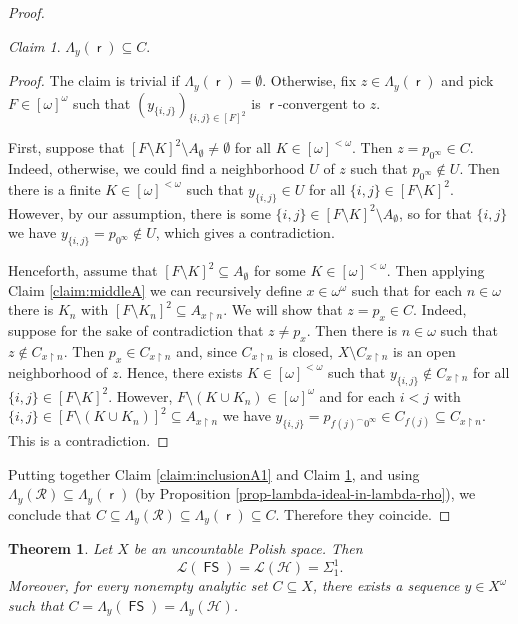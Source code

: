\documentclass{amsart}
\theoremstyle{plain}
\newtheorem{thm}{Theorem}[section]
\theoremstyle{definition}
\theoremstyle{remark}
\newtheorem{claim}{Claim}
\DeclareMathOperator{\FS}{\mathsf{FS}}
\DeclareMathOperator{\rr}{\mathsf{r}}
\begin{document}
\begin{proof}
\begin{claim}\label{claim:inclusionA2}
    $\Lambda_y(\rr)\subseteq C$.
\end{claim}
\begin{proof}
The claim is trivial if $\Lambda_y(\rr)=\emptyset$. Otherwise, fix $z \in \Lambda_y(\rr)$ and pick $F\in[\omega]^\omega$ such that $(y_{\{i,j\}})_{\{i,j\}\in[F]^2}$  
is $\rr$-convergent to $z$. 

First, suppose that $[F\setminus K]^2\setminus A_\emptyset\neq\emptyset$ for all $K\in[\omega]^{<\omega}$. Then $z=p_{0^\infty} \in C$. Indeed, otherwise, we could find a neighborhood $U$ of $z$ such that $p_{0^\infty}\notin U$. Then there is a finite $K\in[\omega]^{<\omega}$ such that $y_{\{i,j\}}\in U$ for all $\{i,j\}\in[F\setminus K]^2$. However, by our assumption, there is some $\{i,j\}\in[F\setminus K]^2\setminus A_\emptyset$, so for that $\{i,j\}$ we have $y_{\{i,j\}}=p_{0^\infty}\notin U$, which gives a contradiction.

Henceforth, assume that $[F\setminus K]^2\subseteq A_\emptyset$ for some $K\in[\omega]^{<\omega}$. Then applying Claim \ref{claim:middleA} we can recursively define $x\in\omega^\omega$ such that for each $n\in\omega$ there is $K_n$ with $[F\setminus K_n]^2\subseteq A_{x\restriction n}$. We will show that $z=p_x\in C$. 
Indeed, suppose for the sake of contradiction that $z\neq p_x$. Then there is $n\in\omega$ such that $z\notin C_{x\restriction n}$. Then $p_x\in C_{x\restriction n}$ and, since $C_{x\restriction n}$ is closed, $X\setminus C_{x\restriction n}$ is an open neighborhood of $z$. Hence, there exists $K\in[\omega]^{<\omega}$ such that $y_{\{i,j\}}\notin C_{x\restriction n}$ for all $\{i,j\}\in[F\setminus K]^2$. However, $F\setminus (K\cup K_n)\in[\omega]^\omega$ and for each $i<j$ with $\{i,j\}\in [F\setminus (K\cup K_n)]^2\subseteq A_{x\restriction n}$ we have $y_{\{i,j\}}=p_{f(j)^\frown 0^\infty}\in C_{f(j)}\subseteq C_{x\restriction n}$. This is a contradiction.
\end{proof} 

Putting together Claim \ref{claim:inclusionA1} and Claim \ref{claim:inclusionA2}, and using  $\Lambda_y(\mathcal{R})\subseteq \Lambda_y(\rr)$ (by Proposition \ref{prop-lambda-ideal-in-lambda-rho}), we conclude that $C\subseteq \Lambda_y(\mathcal{R}) \subseteq \Lambda_y(\rr)\subseteq C$. Therefore they coincide. 
\end{proof}

\begin{thm}\label{thm:mainHindman}
Let $X$ be an uncountable Polish space. Then
\begin{equation*}
\mathscr{L}(\FS)=\mathscr{L}(\mathcal{H})=\Sigma_1^1.
\end{equation*}
Moreover, for every nonempty analytic set $C\subseteq X$,  there exists a sequence $y\in X^{\omega}$ such that $C=\Lambda_y(\FS)=\Lambda_y(\mathcal{H})$. 
\end{thm}
\end{document}
